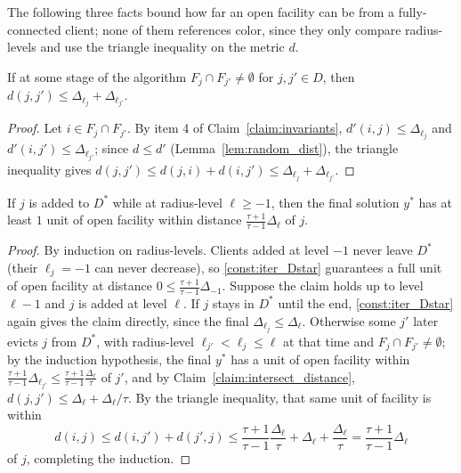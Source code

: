 \documentclass[a4paper,11pt]{article}
\begin{document}
The following three facts bound how far an open facility can be from a
fully-connected client; none of them references color, since they only
compare radius-levels and use the triangle inequality on the metric $d$.

\begin{claim}
\label{claim:intersect_distance}
If at some stage of the algorithm $F_j\cap F_{j'}\neq\emptyset$ for
$j,j'\in D$, then $d(j,j')\le\Delta_{\ell_j}+\Delta_{\ell_{j'}}$.
\end{claim}
\begin{proof}
Let $i\in F_j\cap F_{j'}$. By item 4 of Claim~\ref{claim:invariants},
$d'(i,j)\le\Delta_{\ell_j}$ and $d'(i,j')\le\Delta_{\ell_{j'}}$; since
$d\le d'$ (Lemma~\ref{lem:random_dist}), the triangle inequality gives
$d(j,j')\le d(j,i)+d(i,j')\le\Delta_{\ell_j}+\Delta_{\ell_{j'}}$.
\end{proof}

\begin{claim}
\label{claim:Dstar_distance}
If $j$ is added to $D^*$ while at radius-level $\ell\ge-1$, then the
final solution $y^*$ has at least $1$ unit of open facility within
distance $\frac{\tau+1}{\tau-1}\Delta_\ell$ of $j$.
\end{claim}
\begin{proof}
By induction on radius-levels. Clients added at level $-1$ never leave
$D^*$ (their $\ell_j=-1$ can never decrease), so
\eqref{const:iter_Dstar} guarantees a full unit of open facility at
distance $0\le\frac{\tau+1}{\tau-1}\Delta_{-1}$. Suppose the claim holds
up to level $\ell-1$ and $j$ is added at level $\ell$. If $j$ stays in
$D^*$ until the end, \eqref{const:iter_Dstar} again gives the claim
directly, since the final $\Delta_{\ell_j}\le\Delta_\ell$. Otherwise some
$j'$ later evicts $j$ from $D^*$, with radius-level $\ell_{j'}<\ell_j\le
\ell$ at that time and $F_j\cap F_{j'}\ne\emptyset$; by the induction
hypothesis, the final $y^*$ has a unit of open facility within
$\frac{\tau+1}{\tau-1}\Delta_{\ell_{j'}} \le
\frac{\tau+1}{\tau-1}\frac{\Delta_\ell}{\tau}$ of $j'$, and by
Claim~\ref{claim:intersect_distance}, $d(j,j')\le\Delta_\ell+
\Delta_\ell/\tau$. By the triangle inequality, that same unit of
facility is within
\[
d(i,j) \le d(i,j')+d(j',j) \le \frac{\tau+1}{\tau-1}\frac{\Delta_\ell}{\tau}
+ \Delta_\ell + \frac{\Delta_\ell}{\tau} = \frac{\tau+1}{\tau-1}\Delta_\ell
\]
of $j$, completing the induction.
\end{proof}
\end{document}
